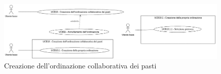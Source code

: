 \newpage
{}
\label{usecase:Creazione dell'ordinazione collaborativa dei pasti}

\begin{figure}[h]
	\centering
	\includegraphics[width=0.99\textwidth]{./uml/UCB10-UCB11.png} 
	\caption{Creazione dell'ordinazione collaborativa dei pasti}
	\label{fig:UCB12-13}
  \end{figure}

